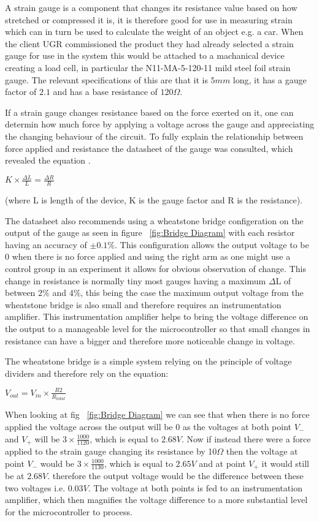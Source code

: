 A strain gauge is a component that changes its resistance value based on how stretched or compressed it is, it is therefore good for use in measuring strain which can in turn be used to calculate the weight of an object e.g. a car. When the client UGR commissioned the product they had already selected a strain gauge for use in the system this would be attached to a machanical device creating a load cell, in particular the N11-MA-5-120-11 mild steel foil strain gauge. The relevant specifications of this are that it is $5mm$ long, it has a gauge factor of $2.1$ and has a base resistance of $120\Omega$.

If a strain gauge changes resistance based on the force exerted on it, one can determin how much force by applying a voltage across the gauge and appreciating the changing behaviour of the circuit. To fully explain the relationship between force applied and resistance the datasheet of the gauge was consulted, which revealed the equation \cite{strain data sheet}.


\centerline{$K \times \frac{\Delta L}{L} = \frac{\Delta R}{R}$}\label{eq:strain}

 (where L is length of the device, K is the gauge factor and R is the resistance).  

The datasheet also recommends using a wheatstone bridge configeration on the output of the gauge as seen in figure ~\ref{fig:Bridge Diagram} with each resistor having an accuracy of $±0.1\%$. This configuration allows the output voltage to be $0$ when there is no force applied and using the right arm as one might use a control group in an experiment it allows for obvious observation of change. This change in resistance is normally tiny most gauges having a maximum $\Delta$L of between $2\%$ and $4\%$, this being the case the maximum output voltage from the wheatstone bridge is also small and therefore requires an instrumentation amplifier. This instrumentation amplifier helps to bring the voltage difference on the output to a manageable level for the microcontroller so that small changes in resistance can have a bigger and therefore more noticeable change in voltage. 

The wheatstone bridge is a simple system relying on the principle of voltage dividers and therefore rely on the equation:

\centerline{$V_{out} = V_{in} \times \frac{R2}{R_{total}}$}\label{eq:divider}

When looking at fig ~\ref{fig:Bridge Diagram} we can see that when there is no force applied the voltage across the output will be $0$ as the voltages at both point $V_-$ and $V_+$ will be $3 \times \frac{1000}{1120}$, which is equal to $2.68V$. Now if instead there were a force applied to the strain gauge changing its resistance by 10$\Omega$ then the voltage at point $V_-$ would be $3 \times \frac{1000}{1130}$, which is equal to $2.65V$ and at point $V_+$ it would still be at $2.68V$. therefore the output voltage would be the difference between these two voltages i.e. $0.03V$. The voltage at both points is fed to an instrumentation amplifier, which then magnifies the voltage difference to a more substantial level for the microcontroller to process. 


